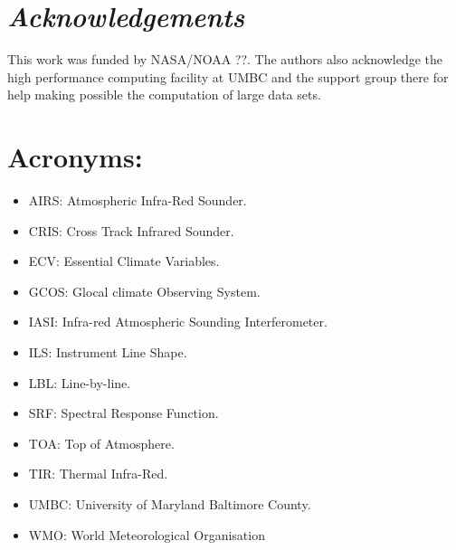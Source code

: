 \documentclass[twocolumn,10pt]{article}
\begin{document}
\section{\it Acknowledgements}
This work was funded by NASA/NOAA ??. The authors also acknowledge the high performance computing facility at UMBC and the support group there for help making possible the computation of large data sets.

\section{Acronyms:}
\begin{itemize}
\item AIRS: Atmospheric Infra-Red Sounder.
\item CRIS: Cross Track Infrared Sounder.
\item ECV: Essential Climate Variables.
\item GCOS: Glocal climate Observing System.
\item IASI: Infra-red Atmospheric Sounding Interferometer.
\item ILS: Instrument Line Shape.
\item LBL: Line-by-line.
\item SRF: Spectral Response Function.
\item TOA: Top of Atmosphere.
\item TIR: Thermal Infra-Red.
\item UMBC: University of Maryland Baltimore County.
\item WMO: World Meteorological Organisation
\end{itemize}
\end{document}
